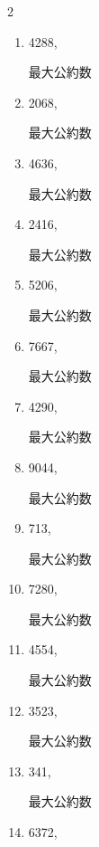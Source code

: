 \begin{multicols}{2}
\begin{enumerate}
        最大公約数

  \item 4288,

        最大公約数

  \item 2068,

        最大公約数

\columnbreak %

\resetques

  \item 4636,

        最大公約数

  \item 2416,

        最大公約数

  \item 5206,

        最大公約数

  \item 7667,

        最大公約数

  \item 4290,

        最大公約数

\columnbreak %

  \item 9044,

        最大公約数

  \item 713,

        最大公約数

  \item 7280,

        最大公約数

  \item 4554,

        最大公約数

  \item 3523,

        最大公約数

\columnbreak %

\resetques

  \item 341,

        最大公約数

  \item 6372,


\end{enumerate}
\end{multicols}
